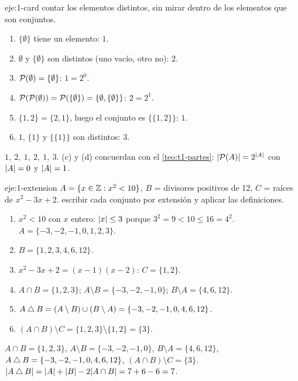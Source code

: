 \begin{solucion}{eje:1-card}
\planteamiento contar los elementos distintos, sin mirar dentro de los elementos que son conjuntos.
\pasos
\begin{enumerate}[label=(\alph*)]
  \item $\{\emptyset\}$ tiene un elemento: $1$.
  \item $\emptyset$ y $\{\emptyset\}$ son distintos (uno vacío, otro no): $2$.
  \item $\mathcal{P}(\emptyset)=\{\emptyset\}$: $1=2^{0}$.
  \item $\mathcal{P}(\mathcal{P}(\emptyset))=\mathcal{P}(\{\emptyset\})=\{\emptyset,\{\emptyset\}\}$: $2=2^{1}$.
  \item $\{1,2\}=\{2,1\}$, luego el conjunto es $\{\{1,2\}\}$: $1$.
  \item $1$, $\{1\}$ y $\{\{1\}\}$ son distintos: $3$.
\end{enumerate}
\resultado $1,\ 2,\ 1,\ 2,\ 1,\ 3$.
\comprobacion (c) y (d) concuerdan con el \cref{teo:t1-partes}: $\lvert\mathcal{P}(A)\rvert=2^{\lvert A\rvert}$ con $\lvert A\rvert=0$ y $\lvert A\rvert=1$.
\end{solucion}

\begin{solucion}{eje:1-extension}
\datos $A=\{x\in\mathbb{Z}: x^{2}<10\}$, $B$ = divisores positivos de 12, $C$ = raíces de $x^{2}-3x+2$.
\planteamiento escribir cada conjunto por extensión y aplicar las definiciones.
\pasos
\begin{enumerate}[label=\arabic*.]
  \item $x^{2}<10$ con $x$ entero: $\lvert x\rvert\le3$ porque $3^{2}=9<10\le16=4^{2}$. $A=\{-3,-2,-1,0,1,2,3\}$.
  \item $B=\{1,2,3,4,6,12\}$.
  \item $x^{2}-3x+2=(x-1)(x-2)$: $C=\{1,2\}$.
  \item $A\cap B=\{1,2,3\}$; $A\setminus B=\{-3,-2,-1,0\}$; $B\setminus A=\{4,6,12\}$.
  \item $A\mathbin{\triangle} B=(A\setminus B)\cup(B\setminus A)=\{-3,-2,-1,0,4,6,12\}$.
  \item $(A\cap B)\setminus C=\{1,2,3\}\setminus\{1,2\}=\{3\}$.
\end{enumerate}
\resultado $A\cap B=\{1,2,3\}$, $A\setminus B=\{-3,-2,-1,0\}$, $B\setminus A=\{4,6,12\}$, $A\mathbin{\triangle} B=\{-3,-2,-1,0,4,6,12\}$, $(A\cap B)\setminus C=\{3\}$.
\comprobacion $\lvert A\mathbin{\triangle} B\rvert=\lvert A\rvert+\lvert B\rvert-2\lvert A\cap B\rvert=7+6-6=7$.
\end{solucion}

